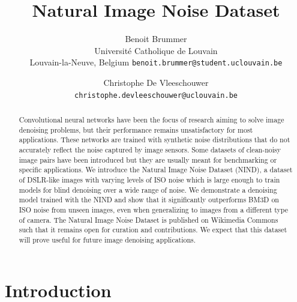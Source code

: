 \documentclass[10pt,twocolumn,letterpaper]{article}
\begin{document}
\title{Natural Image Noise Dataset}

\author{Benoit Brummer\\
Université Catholique de Louvain\\
Louvain-la-Neuve, Belgium
{\tt\small benoit.brummer@student.uclouvain.be}
\and
Christophe De Vleeschouwer\\
{\tt\small christophe.devleeschouwer@uclouvain.be}
}

\maketitle

\begin{abstract}

Convolutional neural networks have been the focus of research aiming to solve image denoising problems, but their performance remains unsatisfactory for most applications. These networks are trained with synthetic noise distributions that do not accurately reflect the noise captured by image sensors. Some datasets of clean-noisy image pairs have been introduced but they are usually meant for benchmarking or specific applications. We introduce the Natural Image Noise Dataset (NIND), a dataset of DSLR-like images with varying levels of ISO noise which is large enough to train models for blind denoising over a wide range of noise. We demonstrate a denoising model trained with the NIND and show that it significantly outperforms BM3D on ISO noise from unseen images, even when generalizing to images from a different type of camera. The Natural Image Noise Dataset is published on Wikimedia Commons such that it remains open for curation and contributions. We expect that this dataset will prove useful for future image denoising applications.

\end{abstract}

\section{Introduction}
\end{document}
